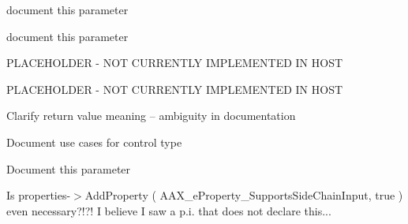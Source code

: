 \begin{DoxyRefList}
%
document this parameter  
\item[Member \mbox{\hyperlink{a02216_aa8443e720e48046444a2e9f712f0864b}{AAX\+\_\+\+IComponent\+Descriptor\+::Add\+Process\+Proc\+\_\+\+TI}} (const char in\+DLLFile\+Name\+UTF8\mbox{[}\mbox{]}, const char in\+Process\+Proc\+Symbol\mbox{[}\mbox{]}, \mbox{\hyperlink{a02316}{AAX\+\_\+\+IProperty\+Map}} $\ast$in\+Properties, const char in\+Instance\+Init\+Proc\+Symbol\mbox{[}\mbox{]}=NULL, const char in\+Background\+Proc\+Symbol\mbox{[}\mbox{]}=NULL, AAX\+\_\+\+CSelector $\ast$out\+Proc\+ID=NULL)=0]\label{a00878__todo000043}%
%
document this parameter  
\item[Member \mbox{\hyperlink{a02224_a26e009667f9cd6c3cccd45b862108bf4}{AAX\+\_\+\+IController\+::Get\+Cycle\+Count}} (AAX\+\_\+\+EProperty in\+Which\+Cycle\+Count, AAX\+\_\+\+CProperty\+Value $\ast$out\+Num\+Cycles) const =0]\label{a00878__todo000045}%
%
PLACEHOLDER -\/ NOT CURRENTLY IMPLEMENTED IN HOST  
\item[Member \mbox{\hyperlink{a02224_a1a654f682357d48bafd506cbbea2ae25}{AAX\+\_\+\+IController\+::Set\+Cycle\+Count}} (AAX\+\_\+\+EProperty $\ast$in\+Which\+Cycle\+Counts, AAX\+\_\+\+CProperty\+Value $\ast$i\+Values, int32\+\_\+t num\+Values)=0]\label{a00878__todo000046}%
%
PLACEHOLDER -\/ NOT CURRENTLY IMPLEMENTED IN HOST  
\item[Member \mbox{\hyperlink{a02252_a44981285d022e5ddee41d903eed68a7d}{AAX\+\_\+\+IDma\+::Is\+Transfer\+Complete}} ()=0]\label{a00878__todo000047}%
%
Clarify return value meaning -- ambiguity in documentation 
\item[Member \mbox{\hyperlink{a02304_a0c096b4092b2146d9aa0413bceeaac48}{AAX\+\_\+\+IParameter\+::Get\+Type}} () const =0]\label{a00878__todo000048}%
%
Document use cases for control type  
\item[Member \mbox{\hyperlink{a02304_a809a5c7f712ed2e5c55e30b6d5557c59}{AAX\+\_\+\+IParameter\+::Set\+Taper\+Delegate}} (\mbox{\hyperlink{a02336}{AAX\+\_\+\+ITaper\+Delegate\+Base}} \&in\+Taper\+Delegate, bool in\+Preserve\+Value)=0]\label{a00878__todo000049}%
%
Document this parameter  
\item[Module \mbox{\hyperlink{a00907}{additional\+Features\+\_\+\+Sidechain}} ]\label{a00878__todo000001}%
%
Is properties-\/$>$Add\+Property ( AAX\+\_\+e\+Property\+\_\+\+Supports\+Side\+Chain\+Input, true ) even necessary?!?! I believe I saw a p.\+i. that does not declare this... 

\end{DoxyRefList}

